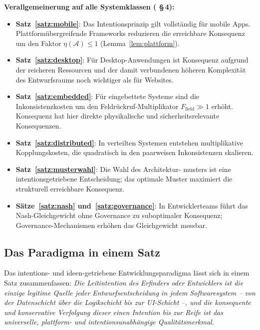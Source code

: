 ﻿\documentclass[a4paper,12pt]{article}
\theoremstyle{definition}
\begin{document}
\textbf{Verallgemeinerung auf alle Systemklassen ( §\,4):}
\begin{itemize}
    \item \textbf{Satz~\ref{satz:mobile}}: Das Intentionsprinzip gilt
          vollständig für mobile Apps. Plattformübergreifende Frameworks
          reduzieren die erreichbare Konsequenz um den Faktor
          $\eta(\mathcal{A}) \leq 1$ (Lemma~\ref{lem:plattform}).
    \item \textbf{Satz~\ref{satz:desktop}}: Für Desktop-Anwendungen
          ist Konsequenz aufgrund der reicheren Ressourcen und der damit
          verbundenen höheren Komplexität des Entwurfsraums noch
          wichtiger als für Websites.
    \item \textbf{Satz~\ref{satz:embedded}}: Für eingebettete Systeme
          sind die Inkonsistenzkosten um den Feldrückruf-Multiplikator
          $F_{\text{field}} \gg 1$ erhöht. Konsequenz hat hier direkte
          physikalische und sicherheitsrelevante Konsequenzen.
    \item \textbf{Satz~\ref{satz:distributed}}: In verteilten Systemen
          entstehen multiplikative Kopplungskosten, die quadratisch in
          den paarweisen Inkonsistenzen skalieren.
    \item \textbf{Satz~\ref{satz:musterwahl}}: Die Wahl des Architektur-
          musters ist eine intentionsgetriebene Entscheidung; das optimale
          Muster maximiert die strukturell erreichbare Konsequenz.
    \item \textbf{Sätze~\ref{satz:nash} und~\ref{satz:governance}}:
          In Entwicklerteams führt das Nash-Gleichgewicht ohne Governance
          zu suboptimaler Konsequenz; Governance-Mechanismen erhöhen das
          Gleichgewicht messbar.
\end{itemize}

\subsection{Das Paradigma in einem Satz}

Das intentions- und ideen-getriebene Entwicklungsparadigma lässt sich
in einem Satz zusammenfassen: \emph{Die Leitintention des Erfinders oder
Entwicklers ist die einzige legitime Quelle jeder Entwurfsentscheidung
in jedem Softwaresystem -- von der Datenschicht über die Logikschicht
bis zur UI-Schicht --, und die konsequente und konservative Verfolgung
dieser einen Intention bis zur Reife ist das universelle, plattform-
und intentionsunabhängige Qualitätsmerkmal.}
\end{document}
